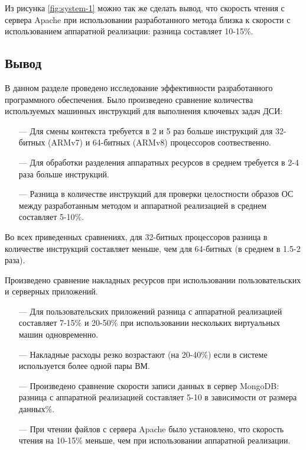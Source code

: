 Из рисунка \ref{fig:system-1} можно так же сделать вывод, что скорость чтения с сервера Apache при использовании разработанного метода близка к скорости с использованием аппаратной реализации: разница составляет 10-15\%.

\subsection*{Вывод}

В данном разделе проведено исследование эффективности разработанного программного обеспечения. Было произведено сравнение количества используемых машинных инструкций для выполнения ключевых задач ДСИ: 

\begin{itemize}
	\item [---] Для смены контекста требуется в 2 и 5 раз больше инструкций для 32-битных (ARMv7) и 64-битных (ARMv8) процессоров соотвественно.
	\item [---] Для обработки разделения аппаратных ресурсов в среднем требуется в 2-4 раза больше инструкций.
	\item [---] Разница в количестве инструкций для проверки целостности образов ОС между разработанным методом и аппаратной реализацией в среднем составляет 5-10\%.
\end{itemize}

Во всех приведенных сравнениях, для 32-битных процессоров разница в количестве инструкций составляет меньше, чем для 64-битных (в среднем в 1.5-2 раза). 

Произведено сравнение накладных ресурсов при использовании пользовательских и серверных приложений.

\begin{itemize}
	\item [---] Для пользовательских приложений разница с аппаратной реализацией составляет 7-15\% и 20-50\% при использовании нескольких виртуальных машин одновременно.
	\item [---] Накладные расходы резко возрастают (на 20-40\%) если в системе используется более одной пары ВМ.
	\item [---] Произведено сравнение скорости записи данных в сервер MongoDB: разница с аппаратной реализацией составляет 5-10 в зависимости от размера данных\%.
	\item [---] При чтении файлов с сервера Apache было установлено, что скорость чтения на 10-15\% меньше, чем при использовании аппаратной реализации.
\end{itemize}

\pagebreak
